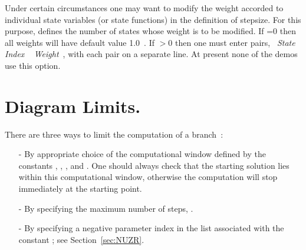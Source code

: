 
Under certain circumstances one may want to modify the weight accorded 
to individual state variables (or state functions) in the definition 
of stepsize.
For this purpose,  defines the number of states whose weight 
is to be modified.
If =0 then all weights will have default value 1.0~.
If $>$0 then one must enter  pairs,
             ~{\it State Index} ~ {\it Weight}~,
with each pair on a separate line.
At present none of the demos use this option.
\section{ Diagram Limits.} \label{sec:Diagram_limits}

There are three ways to limit the computation of a branch~:

\begin{itemize}
\item[-]
By appropriate choice of the computational window 
defined by the constants , , , and .
One should always check that the starting solution lies within
this computational window, otherwise the computation will stop immediately
at the starting point.

\item[-]
By specifying the maximum number of steps, .

\item[-]
By specifying a negative parameter index in the list associated 
with the constant ; see Section~\ref{sec:NUZR}. 
\end{itemize}

\subsection{} \label{sec:NMX}

